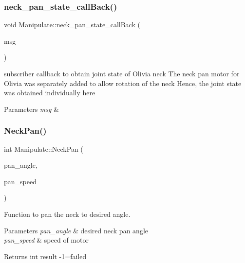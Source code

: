 \subsubsection{\texorpdfstring{neck\+\_\+pan\+\_\+state\+\_\+call\+Back()}{neck\_pan\_state\_callBack()}}
{\footnotesize\ttfamily void Manipulate\+::neck\+\_\+pan\+\_\+state\+\_\+call\+Back (\begin{DoxyParamCaption}\item[{const sensor\+\_\+msgs\+::\+Joint\+State\+::\+Ptr \&}]{msg }\end{DoxyParamCaption})\hspace{0.3cm}{\ttfamily [private]}}



subscriber callback to obtain joint state of Olivia neck The neck pan motor for Olivia was separately added to allow rotation of the neck Hence, the joint state was obtained individually here 


\begin{DoxyParams}{Parameters}
{\em msg} & \\
\hline
\end{DoxyParams}
\mbox{\label{structManipulate_ad830a25f512992ea9629b49763ea72a7}} 
\subsubsection{\texorpdfstring{Neck\+Pan()}{NeckPan()}}
{\footnotesize\ttfamily int Manipulate\+::\+Neck\+Pan (\begin{DoxyParamCaption}\item[{double}]{pan\+\_\+angle,  }\item[{double}]{pan\+\_\+speed }\end{DoxyParamCaption})\hspace{0.3cm}{\ttfamily [private]}}



Function to pan the neck to desired angle. 


\begin{DoxyParams}{Parameters}
{\em pan\+\_\+angle} & desired neck pan angle \\
\hline
{\em pan\+\_\+speed} & speed of motor \\
\hline
\end{DoxyParams}
\begin{DoxyReturn}{Returns}
int result -\/1=failed 
\end{DoxyReturn}
\mbox{\label{structManipulate_a51974f3f0cfc09d119d229b7a3386d24}} 
